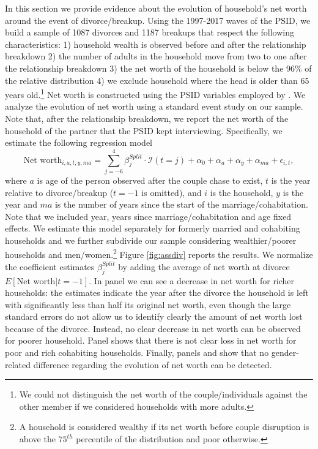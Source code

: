 \documentclass[12pt]{article}
\numberwithin{table}{section}
\begin{document}
In this section we provide evidence about the evolution of household's net worth around the event of divorce/breakup. Using the 1997-2017 waves of the PSID, we build a sample of 1087 divorces and 1187 breakups that respect the following characteristics: 1) household wealth is observed before and after the relationship  breakdown 2) the number of adults in the household move from two to one after the relationship breakdown 3) the net worth of the household is below the 96\% of the relative distribution 4) we exclude household where the head is older than 65 years old.\footnote{We could not distinguish the net worth of the couple/individuals against the other member if we considered households with more adults.} Net worth is constructed using the PSID variables employed by \cite{blundell2016}. We analyze the evolution of net worth using a standard event study on our sample. Note that, after the relationship breakdown, we report the net worth of the household of the partner that the PSID kept interviewing. Specifically, we estimate the following regression model
\begin{equation}\label{eq:ev_studa}
\text{Net worth}_{i,a,t,y,ma}=\sum_{j=-6}^{4}\beta^{Split}_j\cdot\mathcal{I}(t=j)+\alpha_{0}+\alpha_{a}+\alpha_{y}+\alpha_{ma}+\epsilon_{i,t},
\end{equation}
where $a$ is age of the person observed after the couple chase to exist, $t$ is the year relative to divorce/breakup ($t=-1$ is omitted), and $i$ is the household, $y$ is the year and $ma$ is the number of years since the start of the marriage/cohabitation. Note that we included year, years since marriage/cohabitation and age fixed effects.  We estimate this model separately for formerly married and cohabiting households and we further subdivide our sample considering wealthier/poorer households and men/women.\footnote{A household is considered wealthy if its net worth before couple disruption is above the $75^{th}$ percentile of the distribution and poor otherwise.} Figure \ref{fig:assdiv} reports the results. We normalize the coefficient estimates $\beta^{Split}_j$ by adding the average of net worth at divorce $E[\text{Net worth}|t = -1]$. In panel  we can see a decrease in net worth for richer households: the estimates indicate the year after the divorce the household is left with significantly less than half its original net worth, even though the large standard errors do not allow us to identify clearly the amount of net worth lost because of the divorce. Instead, no clear decrease in net worth can be observed for poorer household. Panel  shows that there is not clear loss in net worth for poor and rich cohabiting households. Finally, panels  and  show that no gender-related difference regarding the evolution of net worth can be detected.
\end{document}
